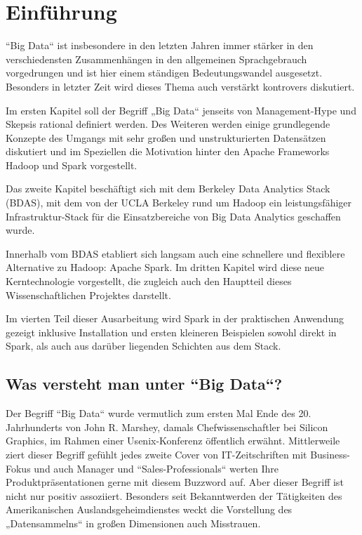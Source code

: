 \chapter{Einführung}
\label{chapter:einfuehrung}

``Big Data“ ist insbesondere in den letzten Jahren immer stärker in den verschiedensten Zusammenhängen in den allgemeinen Sprachgebrauch vorgedrungen und ist hier einem ständigen Bedeutungswandel ausgesetzt. Besonders in letzter Zeit wird dieses Thema auch verstärkt kontrovers diskutiert.  

Im ersten Kapitel soll der Begriff „Big Data“ jenseits von Management-Hype und Skepsis rational definiert werden. Des Weiteren werden einige grundlegende Konzepte des Umgangs mit sehr großen und unstrukturierten Datensätzen diskutiert und im Speziellen die Motivation hinter den Apache Frameworks Hadoop und Spark vorgestellt.  

Das zweite Kapitel beschäftigt sich mit dem Berkeley Data Analytics Stack (BDAS), mit dem von der UCLA Berkeley rund um Hadoop ein leistungsfähiger Infrastruktur-Stack für die Einsatzbereiche von Big Data Analytics geschaffen wurde. 

Innerhalb vom BDAS etabliert sich langsam auch eine schnellere und flexiblere Alternative zu Hadoop: Apache Spark. Im dritten Kapitel wird diese neue Kerntechnologie vorgestellt, die zugleich auch den Hauptteil dieses Wissenschaftlichen Projektes darstellt. 

Im vierten Teil dieser Ausarbeitung wird Spark in der praktischen Anwendung gezeigt inklusive Installation und ersten kleineren Beispielen sowohl direkt in Spark, als auch aus darüber liegenden Schichten aus dem Stack. 

\section{Was versteht man unter ``Big Data“?}
\label{section:was versteht man unter ``Big Data”?}


Der Begriff ``Big Data“ wurde vermutlich zum ersten Mal Ende des 20. Jahrhunderts von John R. Marshey, damals Chefwissenschaftler bei Silicon Graphics, im Rahmen einer Usenix-Konferenz öffentlich erwähnt. Mittlerweile ziert dieser Begriff gefühlt jedes zweite Cover von IT-Zeitschriften mit Business-Fokus und auch Manager und ``Sales-Professionals“ werten Ihre Produktpräsentationen gerne mit diesem Buzzword auf.  Aber dieser Begriff ist nicht nur positiv assoziiert. Besonders seit Bekanntwerden der Tätigkeiten des Amerikanischen Auslandsgeheimdienstes weckt die Vorstellung des „Datensammelns“ in großen Dimensionen auch Misstrauen. 

